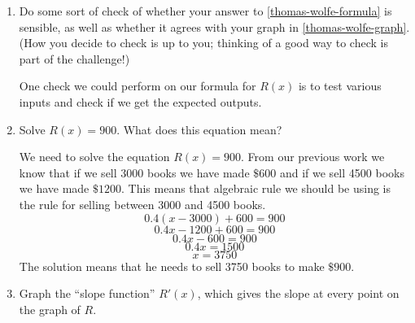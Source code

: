 \documentclass{article}
\begin{document}
\begin{enumerate}
\begin{enumerate}
  \item
    \begin{problem}[\vfill\newpage]
      Do some sort of check of whether your answer to \ref{thomas-wolfe-formula} is sensible, as well as whether it agrees with your graph in \ref{thomas-wolfe-graph}. (How you decide to check is up to you; thinking of a good way to check is part of the challenge!)
    \end{problem}

    \begin{solution}
      One check we could perform on our formula for $R(x)$ is to test various inputs and check
      if we get the expected outputs.
    \end{solution}

  \item


    \begin{problem}[\vfill]
      Solve $R(x) = 900$. What does this equation mean?
    \end{problem}

    \begin{solution} 
      We need to solve the equation $R(x) = 900$. From our previous work we know that if we sell 3000 books we have made $\$600$ and if we sell 4500 books we have made $\$1200$. This means that algebraic rule we should be using is the rule for selling between 3000 and 4500 books.  
      $$0.4(x-3000) +600 =900$$ 
      $$0.4x -1200+600=900$$
      $$0.4x-600=900$$
      $$0.4x=1500$$
      $$x =3750$$
      The solution means that he needs to sell 3750 books to make $\$900$. 
    \end{solution} 

  \item


    \begin{problem}[\vfill]
      Graph the ``slope function'' $R'(x)$, which gives the slope at every
      point on the graph of $R$. 
    \end{problem}


\end{enumerate}
\end{enumerate}
\end{document}
